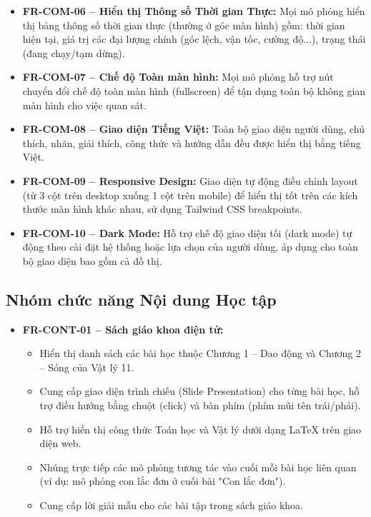 \begin{itemize}
    \item \textbf{FR-COM-06 – Hiển thị Thông số Thời gian Thực:} Mọi mô phỏng hiển thị bảng thông số thời gian thực (thường ở góc màn hình) gồm: thời gian hiện tại, giá trị các đại lượng chính (góc lệch, vận tốc, cường độ...), trạng thái (đang chạy/tạm dừng).
    
    \item \textbf{FR-COM-07 – Chế độ Toàn màn hình:} Mọi mô phỏng hỗ trợ nút chuyển đổi chế độ toàn màn hình (fullscreen) để tận dụng toàn bộ không gian màn hình cho việc quan sát.
    
    \item \textbf{FR-COM-08 – Giao diện Tiếng Việt:} Toàn bộ giao diện người dùng, chú thích, nhãn, giải thích, công thức và hướng dẫn đều được hiển thị bằng tiếng Việt.
    
    \item \textbf{FR-COM-09 – Responsive Design:} Giao diện tự động điều chỉnh layout (từ 3 cột trên desktop xuống 1 cột trên mobile) để hiển thị tốt trên các kích thước màn hình khác nhau, sử dụng Tailwind CSS breakpoints.
    
    \item \textbf{FR-COM-10 – Dark Mode:} Hỗ trợ chế độ giao diện tối (dark mode) tự động theo cài đặt hệ thống hoặc lựa chọn của người dùng, áp dụng cho toàn bộ giao diện bao gồm cả đồ thị.
\end{itemize}

\subsection{Nhóm chức năng Nội dung Học tập}

\begin{itemize}
    \item \textbf{FR-CONT-01 – Sách giáo khoa điện tử:}
    \begin{itemize}
        \item Hiển thị danh sách các bài học thuộc Chương 1 – Dao động và Chương 2 – Sóng của Vật lý 11.
        \item Cung cấp giao diện trình chiếu (Slide Presentation) cho từng bài học, hỗ trợ điều hướng bằng chuột (click) và bàn phím (phím mũi tên trái/phải).
        \item Hỗ trợ hiển thị công thức Toán học và Vật lý dưới dạng LaTeX trên giao diện web.
        \item Nhúng trực tiếp các mô phỏng tương tác vào cuối mỗi bài học liên quan (ví dụ: mô phỏng con lắc đơn ở cuối bài "Con lắc đơn").
        \item Cung cấp lời giải mẫu cho các bài tập trong sách giáo khoa.
    \end{itemize}
\end{itemize}

